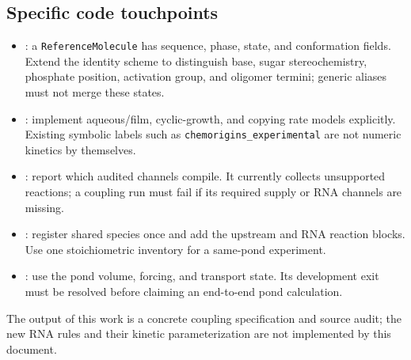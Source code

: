 \documentclass[11pt]{article}
\begin{document}
\subsection{Specific code touchpoints}
\begin{itemize}
\item {}: a \texttt{ReferenceMolecule}
has sequence, phase, state, and conformation fields. Extend the identity scheme
to distinguish base, sugar stereochemistry, phosphate position, activation group,
and oligomer termini; generic aliases must not merge these states.
\item {}: implement aqueous/film,
cyclic-growth, and copying rate models explicitly. Existing symbolic labels
such as \texttt{chemorigins\_experimental} are not numeric kinetics by themselves.
\item {}: report which audited
channels compile. It currently collects unsupported reactions; a coupling run
must fail if its required supply or RNA channels are missing.
\item {}: register shared species once
and add the upstream and RNA reaction blocks. Use one stoichiometric inventory
for a same-pond experiment.
\item {}: use the pond volume,
forcing, and transport state. Its development exit must be resolved before
claiming an end-to-end pond calculation.
\end{itemize}
The output of this work is a concrete coupling specification and source audit;
the new RNA rules and their kinetic parameterization are not implemented by
this document.
\end{document}

